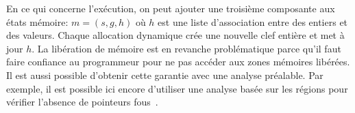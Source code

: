 En ce qui concerne l'exécution, on peut ajouter une troisième composante aux
états mémoire: $m = (s, g, h)$ où $h$ est une liste d'association entre des
entiers et des valeurs. Chaque allocation dynamique crée une nouvelle clef
entière et met à jour $h$. La libération de mémoire est en revanche
problématique parce qu'il faut faire confiance au programmeur pour ne pas
accéder aux zones mémoires libérées. Il est aussi possible d'obtenir cette
garantie avec une analyse préalable. Par exemple, il est possible ici encore
d'utiliser une analyse basée sur les régions pour vérifier l'absence de
pointeurs fous~\cite{ifm10}.




